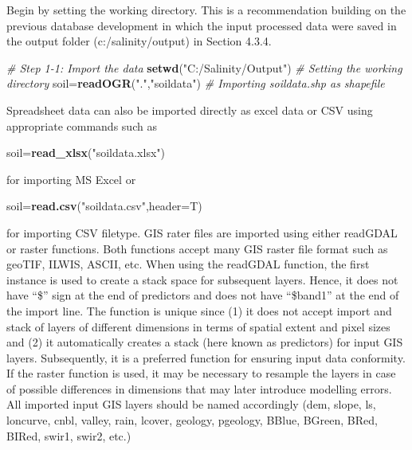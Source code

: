 \documentclass[
  10pt,
  b5paper,
]{book}
\newenvironment{Shaded}{\begin{snugshade}}{\end{snugshade}}
\newcommand{\CommentTok}[1]{\textcolor[rgb]{0.56,0.35,0.01}{\textit{#1}}}
\newcommand{\DataTypeTok}[1]{\textcolor[rgb]{0.13,0.29,0.53}{#1}}
\newcommand{\KeywordTok}[1]{\textcolor[rgb]{0.13,0.29,0.53}{\textbf{#1}}}
\newcommand{\NormalTok}[1]{#1}
\newcommand{\StringTok}[1]{\textcolor[rgb]{0.31,0.60,0.02}{#1}}
\begin{document}
Begin by setting the working directory. This is a recommendation building on the previous database development in which the input processed data were saved in the output folder (c:/salinity/output) in Section 4.3.4.

\begin{Shaded}
\begin{Highlighting}[]
\CommentTok{# Step 1-1: Import the data}
\KeywordTok{setwd}\NormalTok{(}\StringTok{"C:/Salinity/Output"}\NormalTok{) }\CommentTok{# Setting the working directory}
\NormalTok{soil=}\KeywordTok{readOGR}\NormalTok{(}\StringTok{"."}\NormalTok{,}\StringTok{"soildata"}\NormalTok{) }\CommentTok{# Importing soildata.shp as shapefile}
\end{Highlighting}
\end{Shaded}

Spreadsheet data can also be imported directly as excel data or CSV using appropriate commands such as

\begin{Shaded}
\begin{Highlighting}[]
\NormalTok{soil=}\KeywordTok{read_xlsx}\NormalTok{(}\StringTok{"soildata.xlsx"}\NormalTok{) }
\end{Highlighting}
\end{Shaded}

for importing MS Excel or

\begin{Shaded}
\begin{Highlighting}[]
\NormalTok{soil=}\KeywordTok{read.csv}\NormalTok{(}\StringTok{"soildata.csv"}\NormalTok{,}\DataTypeTok{header=}\NormalTok{T) }
\end{Highlighting}
\end{Shaded}

for importing CSV filetype. GIS rater files are imported using either readGDAL or raster functions. Both functions accept many GIS raster file format such as geoTIF, ILWIS, ASCII, etc. When using the readGDAL function, the first instance is used to create a stack space for subsequent layers. Hence, it does not have ``\$'' sign at the end of predictors and does not have ``\$band1'' at the end of the import line. The function is unique since (1) it does not accept import and stack of layers of different dimensions in terms of spatial extent and pixel sizes and (2) it automatically creates a stack (here known as predictors) for input GIS layers. Subsequently, it is a preferred function for ensuring input data conformity. If the raster function is used, it may be necessary to resample the layers in case of possible differences in dimensions that may later introduce modelling errors. All imported input GIS layers should be named accordingly (dem, slope, ls, loncurve, cnbl, valley, rain, lcover, geology, pgeology, BBlue, BGreen, BRed, BIRed, swir1, swir2, etc.)
\end{document}
